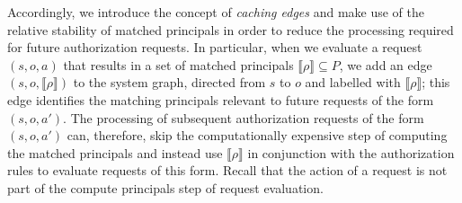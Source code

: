 \documentclass{article}
\newcommand{\semantics}[1]{\llbracket #1 \rrbracket}
\begin{document}
Accordingly, we introduce the concept of \emph{caching edges} and make use of the relative stability of matched principals in order to reduce the processing required for future authorization requests.
In particular, when we evaluate a request $(s,o,a)$ that results in a set of matched principals $\semantics{\rho} \subseteq P$, we add an edge $(s,o,\semantics{\rho})$ to the system graph, directed from $s$ to $o$ and labelled with $\semantics{\rho}$; this edge identifies the matching principals relevant to future requests of the form $(s,o,a')$.
The processing of subsequent authorization requests of the form $(s,o,a')$ can, therefore, skip the computationally expensive step of computing the matched principals and instead use $\semantics{\rho}$ in conjunction with the authorization rules to evaluate requests of this form.
Recall that the action of a request is not part of the compute principals step of request evaluation.
\end{document}
